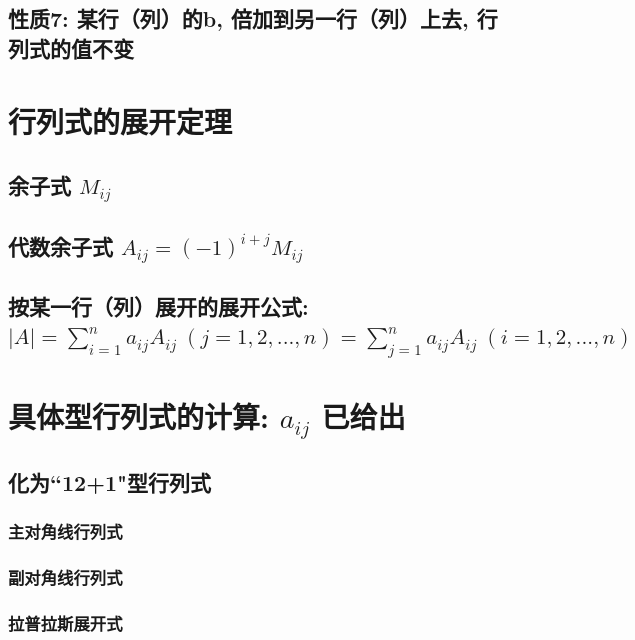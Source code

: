 \documentclass[UTF8]{ctexart}
\begin{document}
	\subsection{性质7: 某行（列）的b, 倍加到另一行（列）上去, 行列式的值不变 }
	
	
	\section{行列式的展开定理}
	
	\subsection{余子式 $M_{ij}$}
	
	\subsection{代数余子式 $	A_{ij}=\left( -1 \right) ^{i+j}M_{ij}$}
	
	\subsection{按某一行（列）展开的展开公式: \\ $|A|=\sum_{i=1}^n{a_{ij}A_{ij}\ \left( j=1,2,...,n \right)}=\sum_{j=1}^n{a_{ij}A_{ij}\ \left( i=1,2,...,n \right)}$	}
	
	
	
	\section{具体型行列式的计算: $a_{ij}$ 已给出}
	
	\subsection{化为``12+1"型行列式}
	
		\subsubsection{主对角线行列式}
		
		\subsubsection{副对角线行列式}
		
		\subsubsection{拉普拉斯展开式}
		
\end{document}
